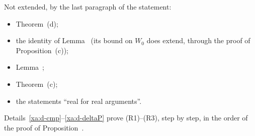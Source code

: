 \begin{detail}
\begin{enumerate}[label=(R\arabic*)]
\end{enumerate}
Not extended, by the last paragraph of the statement:
\begin{itemize}
\item Theorem~(d);
\item the identity of Lemma~ (its bound on $W_0$ does extend, through the proof of Proposition~(c));
\item Lemma~;
\item Theorem~(c);
\item the statements ``real for real arguments''.
\end{itemize}
Details~\ref{xa:d-cmp}--\ref{xa:d-deltaP} prove (R1)--(R3), step by step, in the order of the proof of Proposition~.
\end{detail}

